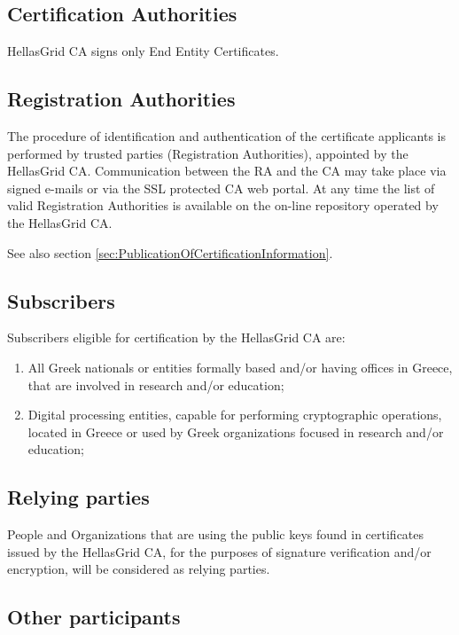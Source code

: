 \subsection{Certification Authorities}

HellasGrid CA signs only End Entity Certificates.

\subsection{Registration Authorities}

The procedure of identification and authentication of the certificate applicants is performed by trusted parties (Registration Authorities), appointed by the HellasGrid CA. Communication between the RA and the CA may take place via signed e-mails or via the SSL protected CA web portal. At any time the list of valid Registration Authorities is available on the on-line repository operated by the HellasGrid CA.

See also section \ref{sec:PublicationOfCertificationInformation}.

\subsection{Subscribers}
\label{sub:Subscribers}

Subscribers eligible for certification by the HellasGrid CA are:

\begin{enumerate}
\item{All Greek nationals or entities formally based and/or having offices in Greece, that are involved in research and/or education;}
\item{Digital processing entities, capable for performing cryptographic operations, located in Greece or used by Greek organizations focused in research and/or education;}
\end{enumerate}


\subsection{Relying parties}


People and Organizations that are using the public keys found in certificates issued by the HellasGrid CA, for the purposes of signature verification and/or encryption, will be considered as relying parties.

\subsection{Other participants}

